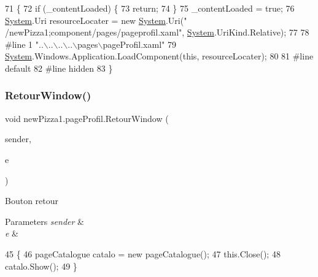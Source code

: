 \begin{DoxyCode}
71                                           \{
72             \textcolor{keywordflow}{if} (\_contentLoaded) \{
73                 \textcolor{keywordflow}{return};
74             \}
75             \_contentLoaded = \textcolor{keyword}{true};
76             \hyperlink{namespaceSystem}{System}.Uri resourceLocater = \textcolor{keyword}{new} \hyperlink{namespaceSystem}{System}.Uri(\textcolor{stringliteral}{"
      /newPizza1;component/pages/pageprofil.xaml"}, \hyperlink{namespaceSystem}{System}.UriKind.Relative);
77             
78 \textcolor{preprocessor}{            #line 1 "..\(\backslash\)..\(\backslash\)..\(\backslash\)..\(\backslash\)pages\(\backslash\)pageProfil.xaml"
}
79             \hyperlink{namespaceSystem}{System}.Windows.Application.LoadComponent(\textcolor{keyword}{this}, resourceLocater);
80             
81 \textcolor{preprocessor}{            #line default
}
82 \textcolor{preprocessor}{            #line hidden
}
83         \}
\end{DoxyCode}
\mbox{\label{classnewPizza1_1_1pageProfil_a070f5a762875f6b8eef7438cb8f550d8}} 
\subsubsection{\texorpdfstring{Retour\+Window()}{RetourWindow()}}
{\footnotesize\ttfamily void new\+Pizza1.\+page\+Profil.\+Retour\+Window (\begin{DoxyParamCaption}\item[{object}]{sender,  }\item[{Routed\+Event\+Args}]{e }\end{DoxyParamCaption})\hspace{0.3cm}{\ttfamily [inline]}}



Bouton retour 


\begin{DoxyParams}{Parameters}
{\em sender} & \\
\hline
{\em e} & \\
\hline
\end{DoxyParams}

\begin{DoxyCode}
45         \{
46             pageCatalogue catalo = \textcolor{keyword}{new} pageCatalogue();
47             this.Close();
48             catalo.Show();
49         \}
\end{DoxyCode}


